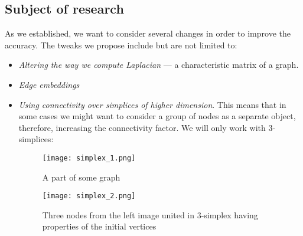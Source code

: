 \subsection{Subject of research}
    As we established, we want to consider several changes in order to improve the accuracy.
    The tweaks we propose include but are not limited to:
    \begin{itemize}
        \item \textit{Altering the way we compute Laplacian} --- a characteristic matrix of a graph.
        \item \textit{Edge embeddings}
        \item \textit{Using connectivity over simplices of higher dimension}. This means that in some cases we might want to consider a group of nodes as a separate object, therefore, increasing the connectivity factor. We will only work with 3-simplices:
            \begin{figure}[h]
                \begin{multicols}{2}
                    \centering
                    \texttt{[image: simplex\_1.png]}
                    \caption{A part of some graph}
        
                    \centering
                    \texttt{[image: simplex\_2.png]}
                    \caption{Three nodes from the left image united in 3-simplex having properties of the initial vertices}
                \end{multicols}
            \end{figure}
    \end{itemize}

